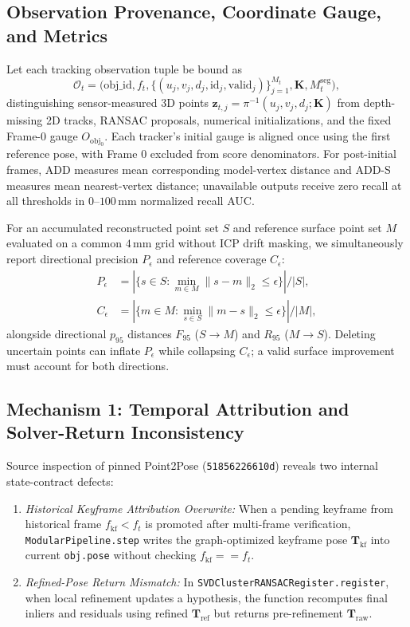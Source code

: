 \documentclass[10pt,journal]{IEEEtran}
\begin{document}
\subsection{Observation Provenance, Coordinate Gauge, and Metrics}
Let each tracking observation tuple be bound as
\begin{equation}
    \mathcal{O}_t=\big(\text{obj\_id},f_t,\{(u_j,v_j,d_j,\text{id}_j,\text{valid}_j)\}_{j=1}^{M_t},\mathbf{K},M_t^{\mathrm{seg}}\big),
\end{equation}
distinguishing sensor-measured 3D points $\mathbf{z}_{t,j}=\pi^{-1}(u_j,v_j,d_j;\mathbf{K})$ from depth-missing 2D tracks, RANSAC proposals, numerical initializations, and the fixed Frame-0 gauge $O_{\mathrm{obj}_0}$. Each tracker's initial gauge is aligned once using the first reference pose, with Frame 0 excluded from score denominators. For post-initial frames, ADD measures mean corresponding model-vertex distance and ADD-S measures mean nearest-vertex distance; unavailable outputs receive zero recall at all thresholds in $0$--$100\,\mathrm{mm}$ normalized recall AUC.

For an accumulated reconstructed point set $S$ and reference surface point set $M$ evaluated on a common $4\,\mathrm{mm}$ grid without ICP drift masking, we simultaneously report directional precision $P_\epsilon$ and reference coverage $C_\epsilon$:
\begin{align}
    P_\epsilon &= |\{s\in S:\min_{m\in M}\|s-m\|_2\le\epsilon\}|/|S|, \\
    C_\epsilon &= |\{m\in M:\min_{s\in S}\|m-s\|_2\le\epsilon\}|/|M|,
\end{align}
alongside directional $p_{95}$ distances $F_{95}$ ($S\to M$) and $R_{95}$ ($M\to S$). Deleting uncertain points can inflate $P_\epsilon$ while collapsing $C_\epsilon$; a valid surface improvement must account for both directions.

\subsection{Mechanism 1: Temporal Attribution and Solver-Return Inconsistency}
Source inspection of pinned Point2Pose (\texttt{51856226610d}) reveals two internal state-contract defects:
\begin{enumerate}
    \item \emph{Historical Keyframe Attribution Overwrite:} When a pending keyframe from historical frame $f_{\mathrm{kf}}<f_t$ is promoted after multi-frame verification, \texttt{ModularPipeline.step} writes the graph-optimized keyframe pose $\mathbf{T}_{\mathrm{kf}}$ into current \texttt{obj.pose} without checking $f_{\mathrm{kf}}==f_t$.
    \item \emph{Refined-Pose Return Mismatch:} In \texttt{SVDClusterRANSACRegister.register}, when local refinement updates a hypothesis, the function recomputes final inliers and residuals using refined $\mathbf{T}_{\mathrm{ref}}$ but returns pre-refinement $\mathbf{T}_{\mathrm{raw}}$.
\end{enumerate}
\end{document}
